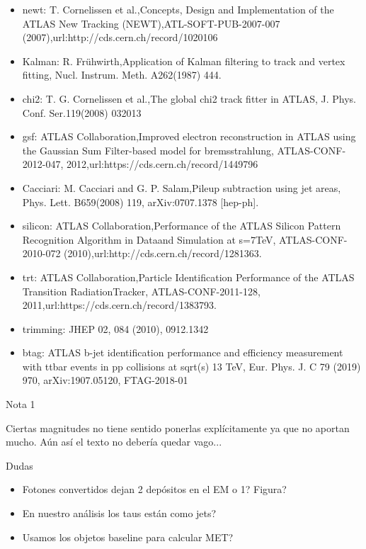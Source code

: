 \begin{itemize}
	\item newt: T. Cornelissen et al.,Concepts, Design and Implementation of the ATLAS New Tracking (NEWT),ATL-SOFT-PUB-2007-007 (2007),url:http://cds.cern.ch/record/1020106
	\item Kalman: R. Frühwirth,Application of Kalman filtering to track and vertex fitting, Nucl. Instrum. Meth. A262(1987) 444.
	\item chi2: T. G. Cornelissen et al.,The global chi2 track fitter in ATLAS, J. Phys. Conf. Ser.119(2008) 032013
	\item gsf: ATLAS Collaboration,Improved electron reconstruction in ATLAS using the Gaussian Sum Filter-based model for bremsstrahlung, ATLAS-CONF-2012-047, 2012,url:https://cds.cern.ch/record/1449796
	\item Cacciari: M. Cacciari and G. P. Salam,Pileup subtraction using jet areas, Phys. Lett. B659(2008) 119, arXiv:0707.1378 [hep-ph].
	\item silicon: ATLAS Collaboration,Performance of the ATLAS Silicon Pattern Recognition Algorithm in Dataand Simulation at s=7TeV, ATLAS-CONF-2010-072 (2010),url:http://cds.cern.ch/record/1281363.
	\item trt: ATLAS Collaboration,Particle Identification Performance of the ATLAS Transition RadiationTracker, ATLAS-CONF-2011-128, 2011,url:https://cds.cern.ch/record/1383793.
	\item trimming: JHEP 02, 084 (2010), 0912.1342
	\item btag:  ATLAS b-jet identification performance and efficiency measurement with ttbar events in pp collisions at sqrt(s) 13 TeV, Eur. Phys. J. C 79 (2019) 970, arXiv:1907.05120, FTAG-2018-01 

\end{itemize}


\vspace{2cm}


{\LARGE Nota 1}

Ciertas magnitudes no tiene sentido ponerlas explícitamente ya que no aportan mucho. Aún así el texto no debería quedar vago...


\vspace{2cm}


{\LARGE Dudas}

\begin{itemize}
	\item Fotones convertidos dejan 2 depósitos en el EM o 1? Figura?
	\item En nuestro análisis los taus están como jets?
	\item Usamos los objetos baseline para calcular MET?
\end{itemize}

